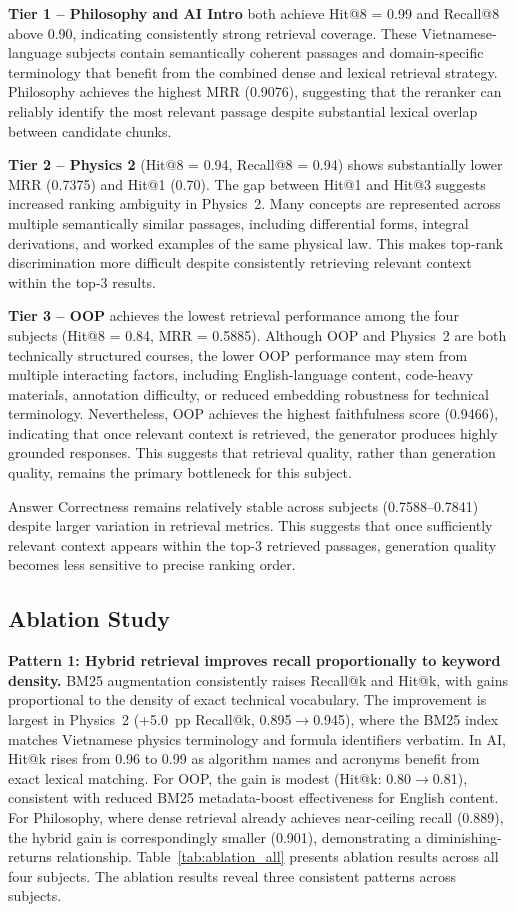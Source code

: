 \documentclass[runningheads]{llncs}
\begin{document}
\textbf{Tier 1 -- Philosophy and AI Intro} both achieve Hit@8 = 0.99 and Recall@8 above 0.90, indicating consistently strong retrieval coverage. These Vietnamese-language subjects contain semantically coherent passages and domain-specific terminology that benefit from the combined dense and lexical retrieval strategy. Philosophy achieves the highest MRR (0.9076), suggesting that the reranker can reliably identify the most relevant passage despite substantial lexical overlap between candidate chunks.

\textbf{Tier 2 -- Physics 2} (Hit@8 = 0.94, Recall@8 = 0.94) shows substantially lower MRR (0.7375) and Hit@1 (0.70). The gap between Hit@1 and Hit@3 suggests increased ranking ambiguity in Physics~2. Many concepts are represented across multiple semantically similar passages, including differential forms, integral derivations, and worked examples of the same physical law. This makes top-rank discrimination more difficult despite consistently retrieving relevant context within the top-3 results.

\textbf{Tier 3 -- OOP} achieves the lowest retrieval performance among the four subjects (Hit@8 = 0.84, MRR = 0.5885). Although OOP and Physics~2 are both technically structured courses, the lower OOP performance may stem from multiple interacting factors, including English-language content, code-heavy materials, annotation difficulty, or reduced embedding robustness for technical terminology. Nevertheless, OOP achieves the highest faithfulness score (0.9466), indicating that once relevant context is retrieved, the generator produces highly grounded responses. This suggests that retrieval quality, rather than generation quality, remains the primary bottleneck for this subject.

Answer Correctness remains relatively stable across subjects (0.7588--0.7841) despite larger variation in retrieval metrics. This suggests that once sufficiently relevant context appears within the top-3 retrieved passages, generation quality becomes less sensitive to precise ranking order.
\FloatBarrier
\subsection{Ablation Study}

\noindent\textbf{Pattern 1: Hybrid retrieval improves recall proportionally to keyword density.} BM25 augmentation consistently raises Recall@k and Hit@k, with gains proportional to the density of exact technical vocabulary. The improvement is largest in Physics~2 (+5.0~pp Recall@k, 0.895$\to$0.945), where the BM25 index matches Vietnamese physics terminology and formula identifiers verbatim. In AI, Hit@k rises from 0.96 to 0.99 as algorithm names and acronyms benefit from exact lexical matching. For OOP, the gain is modest (Hit@k: 0.80$\to$0.81), consistent with reduced BM25 metadata-boost effectiveness for English content. For Philosophy, where dense retrieval already achieves near-ceiling recall (0.889), the hybrid gain is correspondingly smaller (0.901), demonstrating a diminishing-returns relationship. Table~\ref{tab:ablation_all} presents ablation results across all four subjects. The ablation results reveal three consistent patterns across subjects.
\end{document}
